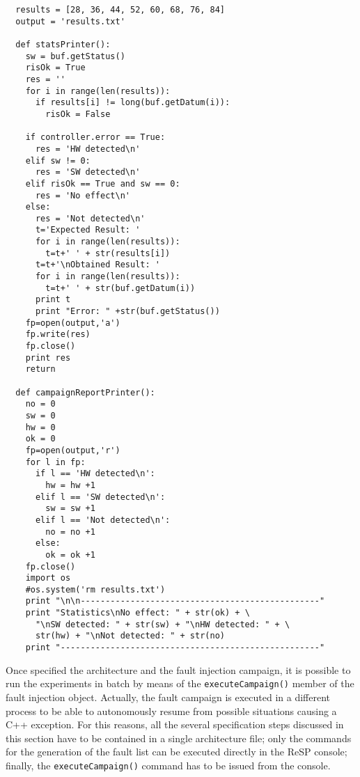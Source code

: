 \scriptsize
\begin{verbatim}
  results = [28, 36, 44, 52, 60, 68, 76, 84]
  output = 'results.txt'

  def statsPrinter():
    sw = buf.getStatus()
    risOk = True
    res = ''
    for i in range(len(results)):
      if results[i] != long(buf.getDatum(i)):
        risOk = False
        
    if controller.error == True:
      res = 'HW detected\n'
    elif sw != 0:
      res = 'SW detected\n'
    elif risOk == True and sw == 0:
      res = 'No effect\n'
    else:
      res = 'Not detected\n'
      t='Expected Result: '
      for i in range(len(results)):
        t=t+' ' + str(results[i])
      t=t+'\nObtained Result: '
      for i in range(len(results)):
        t=t+' ' + str(buf.getDatum(i))      
      print t
      print "Error: " +str(buf.getStatus())
    fp=open(output,'a')
    fp.write(res)
    fp.close()
    print res
    return

  def campaignReportPrinter():
    no = 0
    sw = 0
    hw = 0
    ok = 0
    fp=open(output,'r')
    for l in fp:
      if l == 'HW detected\n':
        hw = hw +1
      elif l == 'SW detected\n':
        sw = sw +1
      elif l == 'Not detected\n':
        no = no +1
      else:
        ok = ok +1 
    fp.close()
    import os
    #os.system('rm results.txt')
    print "\n\n------------------------------------------------" 
    print "Statistics\nNo effect: " + str(ok) + \
      "\nSW detected: " + str(sw) + "\nHW detected: " + \
      str(hw) + "\nNot detected: " + str(no)   
    print "----------------------------------------------------" 
\end{verbatim}
\normalsize

\indent Once specified the architecture and the fault injection campaign, it is possible to run the experiments in batch by means of the \texttt{executeCampaign()} member of the fault injection object. Actually, the fault campaign is executed in a different process to be able to autonomously resume from possible situations causing a C++ exception. For this reasons, all the several specification steps discussed in this section have to be contained in a single architecture file; only the commands for the generation of the fault list can be executed directly in the ReSP console; finally, the \texttt{executeCampaign()} command has to be issued from the console.
